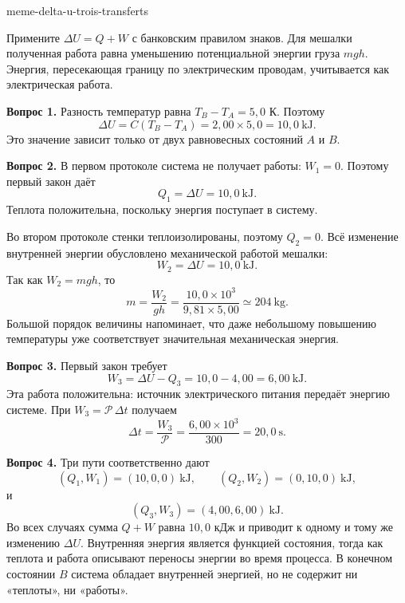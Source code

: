 \begin{exo}{meme-delta-u-trois-transferts}
\begin{indication}
Примените $\Delta U=Q+W$ с банковским правилом знаков. Для мешалки
полученная работа равна уменьшению потенциальной энергии груза $mgh$.
Энергия, пересекающая границу по электрическим проводам, учитывается как электрическая работа.
\end{indication}

\begin{solution}
\textbf{Вопрос 1.} Разность температур равна $T_B-T_A=5{,}0$ К. Поэтому
\[
\Delta U=C(T_B-T_A)
=2{,}00\times5{,}0
=10{,}0\ \mathrm{kJ}.
\]
Это значение зависит только от двух равновесных состояний $A$ и $B$.

\textbf{Вопрос 2.} В первом протоколе система не получает работы:
$W_1=0$. Поэтому первый закон даёт
\[
Q_1=\Delta U=10{,}0\ \mathrm{kJ}.
\]
Теплота положительна, поскольку энергия поступает в систему.

Во втором протоколе стенки теплоизолированы, поэтому $Q_2=0$.
Всё изменение внутренней энергии обусловлено механической работой мешалки:
\[
W_2=\Delta U=10{,}0\ \mathrm{kJ}.
\]
Так как $W_2=mgh$, то
\[
m=\frac{W_2}{gh}
=\frac{10{,}0\times10^3}{9{,}81\times5{,}00}
\simeq 204\ \mathrm{kg}.
\]
Большой порядок величины напоминает, что даже небольшому повышению температуры
уже соответствует значительная механическая энергия.

\textbf{Вопрос 3.} Первый закон требует
\[
W_3=\Delta U-Q_3=10{,}0-4{,}00=6{,}00\ \mathrm{kJ}.
\]
Эта работа положительна: источник электрического питания передаёт энергию системе.
При $W_3=\mathcal P\,\Delta t$ получаем
\[
\Delta t=\frac{W_3}{\mathcal P}
=\frac{6{,}00\times10^3}{300}
=20{,}0\ \mathrm{s}.
\]

\textbf{Вопрос 4.} Три пути соответственно дают
\[
(Q_1,W_1)=(10{,}0,0)\ \mathrm{kJ},
\qquad
(Q_2,W_2)=(0,10{,}0)\ \mathrm{kJ},
\]
и
\[
(Q_3,W_3)=(4{,}00,6{,}00)\ \mathrm{kJ}.
\]
Во всех случаях сумма $Q+W$ равна $10{,}0$ кДж и приводит к одному и тому же
изменению $\Delta U$. Внутренняя энергия является функцией состояния, тогда как
теплота и работа описывают переносы энергии во время процесса. В конечном
состоянии $B$ система обладает внутренней энергией, но не содержит ни «теплоты», ни «работы».
\end{solution}
\end{exo}

